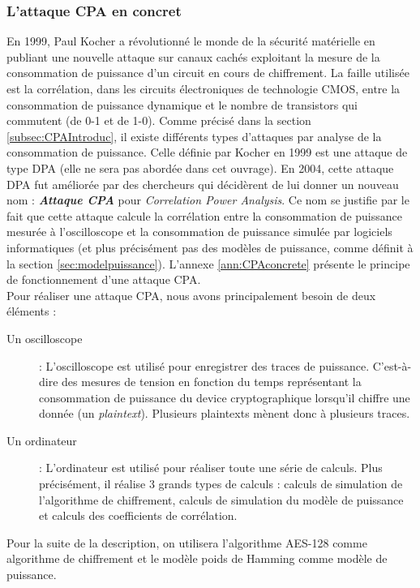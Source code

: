 \documentclass[oneside]{book}
\begin{document}
\subsubsection{L'attaque CPA en concret}
\label{sec:CPAEntire}
En 1999, Paul Kocher a révolutionné le monde de la sécurité matérielle en publiant une nouvelle attaque sur canaux cachés exploitant la mesure de la consommation de puissance d’un circuit en cours de chiffrement. La faille utilisée est la corrélation, dans les circuits électroniques de technologie CMOS, entre la consommation de puissance dynamique et le nombre de transistors qui commutent (de 0-1 et de 1-0). Comme précisé dans la section \ref{subsec:CPAIntroduc}, il existe différents types d'attaques par analyse de la consommation de puissance. Celle définie par Kocher en 1999 est une attaque de type DPA (elle ne sera pas abordée dans cet ouvrage). En 2004, cette attaque DPA fut améliorée par des chercheurs qui décidèrent de lui donner un nouveau nom : \textbf{\textit{Attaque CPA}} pour \textit{Correlation Power Analysis}. Ce nom se justifie par le fait que cette attaque calcule la corrélation entre la consommation de puissance mesurée à l'oscilloscope et la consommation de puissance simulée par logiciels informatiques (et plus précisément pas des modèles de puissance, comme définit à la section \ref{sec:modelpuissance}). L'annexe \ref{ann:CPAconcrete} présente le principe de fonctionnement d'une attaque CPA.\vspace{0.25 cm} \\
\hspace{-0.5 cm}Pour réaliser une attaque CPA, nous avons  principalement besoin de deux éléments :
\begin{description}
\item[Un oscilloscope] : L'oscilloscope est utilisé pour enregistrer des traces de puissance. C'est-à-dire des mesures de tension en fonction du temps représentant la consommation de puissance du device cryptographique lorsqu'il chiffre une donnée (un \textit{plaintext}). Plusieurs plaintexts mènent donc à plusieurs traces.
\item[Un ordinateur] : L'ordinateur est utilisé pour réaliser toute une série de calculs. Plus précisément, il réalise 3 grands types de calculs : calculs de simulation de l'algorithme de chiffrement, calculs de simulation du modèle de puissance et calculs des coefficients de corrélation.
\end{description}
Pour la suite de la description, on utilisera l'algorithme AES-128 comme algorithme de chiffrement et le modèle poids de Hamming comme modèle de puissance.
\end{document}
